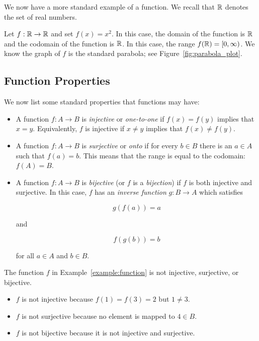 \begin{example}
We now have a more standard example of a \gls{function}.
We recall that $\mathbb{R}$ denotes the set of real numbers.



Let $f:\mathbb{R}\to\mathbb{R}$ and set $f(x) = x^{2}$.
In this case, the domain of the \gls{function} is $\mathbb{R}$
and the codomain of the \gls{function} is $\mathbb{R}$.
In this case, the range $f(\mathbb{R}) = [0,\infty)$.
We know the graph of $f$ is the standard parabola;
see Figure~\ref{fig:parabola_plot}.
\end{example}

\subsection{Function Properties}

We now list some standard properties that \glspl{function} may have:

\begin{itemize}
\item A \gls{function} $f:A\to B$ is \emph{\gls{injective}}
    or \emph{one-to-one} if $f(x) = f(y)$ implies that $x = y$.
    Equivalently, $f$ is injective if $x\ne y$ implies that $f(x) \ne f(y)$.
\item A \gls{function} $f:A\to B$ is \emph{\gls{surjective}} or \emph{onto}
    if for every $b\in B$ there is an $a\in A$ such that $f(a) = b$.
    This means that the range is equal to the codomain: $f(A) = B$.
\item A \gls{function} $f:A\to B$ is \emph{\gls{bijective}}
    (or $f$ is a \emph{bijection})
    if $f$ is both \gls{injective} and \gls{surjective}.
    In this case, $f$ has an \emph{inverse function} $g:B\to A$
    which satisfies

\begin{equation}
    g(f(a)) = a
\end{equation}

\noindent
and

\begin{equation}
    f(g(b)) = b
\end{equation}

\noindent
for all $a\in A$ and $b\in B$.
\end{itemize}

\begin{example}
The \gls{function} $f$ in Example~\ref{example:function}
is not \gls{injective}, \gls{surjective}, or \gls{bijective}.

\begin{itemize}
\item $f$ is not \gls{injective} because $f(1) = f(3) = 2$ but $1\ne3$.
\item $f$ is not \gls{surjective} because no element is mapped to $4\in B$.
\item $f$ is not \gls{bijective} because it is not
    \gls{injective} and \gls{surjective}.
\end{itemize}
\end{example}

